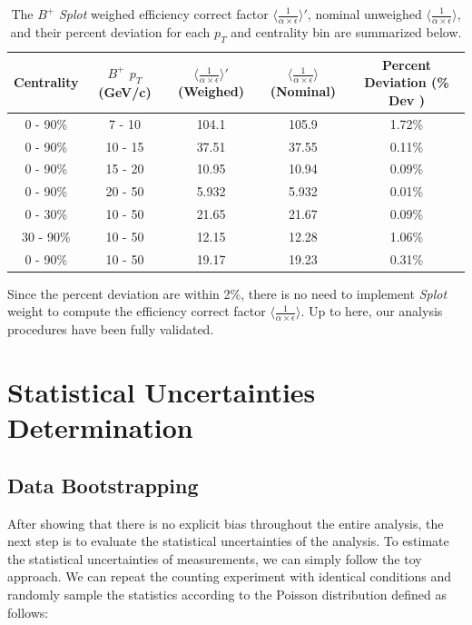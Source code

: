\begin{table}[h]
\begin{center}
\caption{The $B^+$ \textit{Splot} weighed efficiency correct factor $\langle \frac{1}{\alpha \times \epsilon}\rangle'$, nominal unweighed $\langle \frac{1}{\alpha \times \epsilon} \rangle$, and their percent deviation for each $p_T$ and centrality bin are summarized below.}
\vspace{1em}
\label{BPSplotTable}
  \begin{tabular}{| c | c |c |c | c|}
    \hline
     Centrality &   $B^+$  $p_T$ (GeV/c) & $\langle \frac{1}{\alpha \times \epsilon} \rangle'$ (Weighed) & $\langle \frac{1}{\alpha \times \epsilon} \rangle$ (Nominal)  & Percent Deviation (\% Dev ) \\
    \hline
    \hline
0 - 90\% & 7 - 10   &  104.1  & 105.9 & 1.72\% \\ 
0 - 90\% & 10 - 15 &   37.51 & 37.55  & 0.11\%  \\ 
0 - 90\% & 15 - 20 &  10.95  &  10.94 & 0.09\% \\ 
0 - 90\% & 20 - 50 &   5.932 & 5.932 & 0.01\%  \\ 
0 - 30\% & 10 - 50 &  21.65  &21.67 & 0.09\%  \\ 
30 - 90\% & 10 - 50 &  12.15 &12.28 & 1.06\% \\ 
0 - 90\% & 10 - 50 &   19.17  & 19.23 &  0.31\% \\ 
    \hline
    \hline
\end{tabular}
\end{center}
\end{table}




Since the percent deviation are within 2\%, there is no need to implement \textit{Splot} weight to compute the  efficiency correct factor $\langle \frac{1}{\alpha \times \epsilon}\rangle$. Up to here, our analysis procedures have been fully validated. 

\section{Statistical Uncertainties Determination} 




\subsection{Data Bootstrapping}


After showing that there is no explicit bias throughout the entire analysis, the next step is to evaluate the statistical uncertainties of the analysis. To estimate the statistical uncertainties of measurements, we can simply follow the toy approach. We can repeat the counting experiment with identical conditions and randomly sample the statistics according to the Poisson distribution defined as follows:

